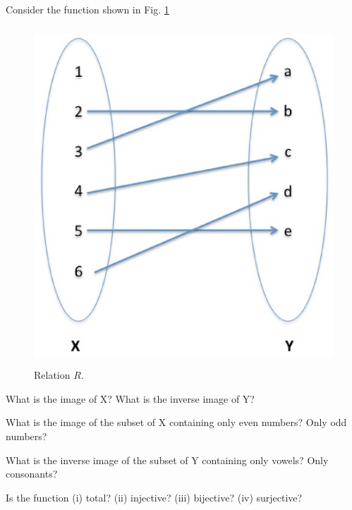\documentclass[handout]{mcs}
\begin{document}


\begin{problem}
Consider the function shown in Fig. \ref{fig:img} 

\begin{figure}[h]

\includegraphics[height = 5in ]{image-inverseimage2}

\caption{Relation $R$.}
\label{fig:img}
\end{figure}

\bparts

\ppart What is the image of X? What is the inverse image of Y?

\ppart What is the image of the subset of X containing only even numbers? Only odd numbers?

\ppart What is the inverse image of the subset of Y containing only vowels? Only consonants?

\ppart Is the function (i) total? (ii) injective? (iii) bijective? (iv) surjective?

\end{problem}

\end{document}
